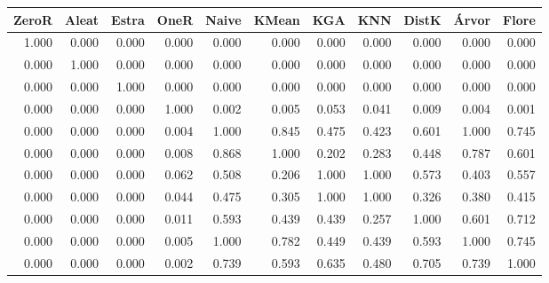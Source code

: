 \begin{table}
\centering
\label{Iris_p_value_table}
\begin{tabular}{rrrrrrrrrrr}
\toprule
ZeroR & Aleat & Estra & OneR  & Naive & KMean &   KGA &   KNN & DistK & Árvor & Flore \\
\midrule
1.000 & 0.000 & 0.000 & 0.000 & 0.000 & 0.000 & 0.000 & 0.000 & 0.000 & 0.000 & 0.000 \\
0.000 & 1.000 & 0.000 & 0.000 & 0.000 & 0.000 & 0.000 & 0.000 & 0.000 & 0.000 & 0.000 \\
0.000 & 0.000 & 1.000 & 0.000 & 0.000 & 0.000 & 0.000 & 0.000 & 0.000 & 0.000 & 0.000 \\
0.000 & 0.000 & 0.000 & 1.000 & 0.002 & 0.005 & 0.053 & 0.041 & 0.009 & 0.004 & 0.001 \\
0.000 & 0.000 & 0.000 & 0.004 & 1.000 & 0.845 & 0.475 & 0.423 & 0.601 & 1.000 & 0.745 \\
0.000 & 0.000 & 0.000 & 0.008 & 0.868 & 1.000 & 0.202 & 0.283 & 0.448 & 0.787 & 0.601 \\
0.000 & 0.000 & 0.000 & 0.062 & 0.508 & 0.206 & 1.000 & 1.000 & 0.573 & 0.403 & 0.557 \\
0.000 & 0.000 & 0.000 & 0.044 & 0.475 & 0.305 & 1.000 & 1.000 & 0.326 & 0.380 & 0.415 \\
0.000 & 0.000 & 0.000 & 0.011 & 0.593 & 0.439 & 0.439 & 0.257 & 1.000 & 0.601 & 0.712 \\
0.000 & 0.000 & 0.000 & 0.005 & 1.000 & 0.782 & 0.449 & 0.439 & 0.593 & 1.000 & 0.745 \\
0.000 & 0.000 & 0.000 & 0.002 & 0.739 & 0.593 & 0.635 & 0.480 & 0.705 & 0.739 & 1.000 \\
\bottomrule
\end{tabular}
\end{table}
